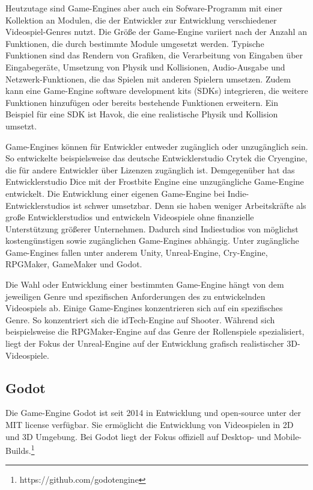 Heutzutage sind Game-Engines aber auch ein Sofware-Programm mit einer Kollektion an Modulen, die der Entwickler zur Entwicklung verschiedener Videospiel-Genres nutzt. Die Gr\"{o}\ss{}e der Game-Engine variiert nach der Anzahl an Funktionen, die durch bestimmte Module umgesetzt werden. Typische Funktionen sind das Rendern von Grafiken, die Verarbeitung von Eingaben \"{u}ber Eingabeger\"{a}te, Umsetzung von Physik und Kollisionen, Audio-Ausgabe und Netzwerk-Funktionen, die das Spielen mit anderen Spielern umsetzen. Zudem kann eine Game-Engine software development kits (SDKs) integrieren, die weitere Funktionen hinzuf\"{u}gen oder bereits bestehende Funktionen erweitern. Ein Beispiel f\"{u}r eine SDK ist Havok, die eine realistische Physik und Kollision umsetzt.\autocite{gregory2018game}

Game-Engines k\"{o}nnen f\"{u}r Entwickler entweder zug\"{a}nglich oder unzug\"{a}nglich sein. So entwickelte beispielsweise das deutsche Entwicklerstudio Crytek die Cryengine, die f\"{u}r andere Entwickler \"{u}ber Lizenzen zug\"{a}nglich ist. Demgegen\"{u}ber hat das Entwicklerstudio Dice mit der Frostbite Engine eine unzug\"{a}ngliche Game-Engine entwickelt. Die Entwicklung einer eigenen Game-Engine bei Indie-Entwicklerstudios ist schwer umsetzbar. Denn sie haben weniger Arbeitskr\"{a}fte als gro\ss{}e Entwicklerstudios und entwickeln Videospiele ohne finanzielle Unterst\"{u}tzung gr\"{o}\ss{}erer Unternehmen. Dadurch sind Indiestudios von m\"{o}glichst kosteng\"{u}nstigen sowie zug\"{a}nglichen Game-Engines abh\"{a}ngig. Unter zug\"{a}ngliche Game-Engines fallen unter anderem Unity, Unreal-Engine, Cry-Engine, RPGMaker, GameMaker und Godot.

Die Wahl oder Entwicklung einer bestimmten Game-Engine h\"{a}ngt von dem jeweiligen Genre und spezifischen Anforderungen des zu entwickelnden Videospiels ab. Einige Game-Engines konzentrieren sich auf ein spezifisches Genre. So konzentriert sich die idTech-Engine auf Shooter. W\"{a}hrend sich beispielsweise die RPGMaker-Engine auf das Genre der Rollenspiele spezialisiert, liegt der Fokus der Unreal-Engine auf der Entwicklung grafisch realistischer 3D-Videospiele.


\subsection{Godot}
\label{chap:godot}
Die Game-Engine Godot ist seit 2014 in Entwicklung und open-source unter der MIT license verf\"{u}gbar. Sie erm\"{o}glicht die Entwicklung von Videospielen in 2D und 3D Umgebung. Bei Godot liegt der Fokus offiziell auf Desktop- und Mobile-Builds.\footnote{https://github.com/godotengine}

